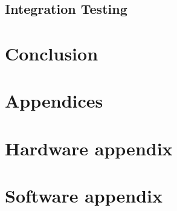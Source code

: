 \section{Integration Testing}
 \newpage
 \newpage
 \newpage
 \newpage

\chapter{Conclusion}

\chapter{Appendices}

\newpage
\listoffigures
{}
\newpage
\listoftables
{}
\newpage
\chapter{Hardware appendix}

\chapter{Software appendix}


\printbibliography
\listoffixmes
